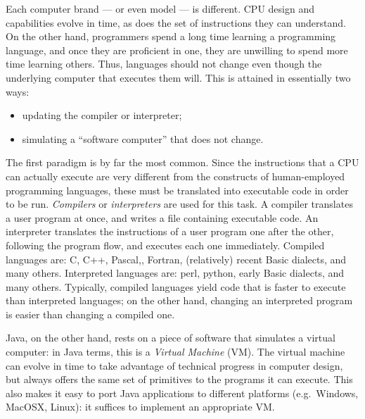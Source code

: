 \documentclass[a4paper]{book}
\theoremstyle{changebreak}                %
\begin{document}
Each computer brand --- or even model --- is different. CPU
design and capabilities evolve in time, as does the set of
instructions they can understand. On the other
hand, programmers spend a long time learning a programming
language, and once they are proficient in
one, they are unwilling to spend more time learning others. Thus,
languages should not change even though the underlying computer that
executes them will. This is attained in essentially two ways:
\begin{itemize}
\item updating the compiler or
  interpreter;
\item simulating a ``software computer'' that does not change.
\end{itemize}
The first paradigm is by far the most common. Since the instructions
that a CPU can actually execute are very different from the constructs
of human-employed programming languages, these must be translated into
executable code in order to be run. {\it Compilers} or
{\it interpreters} are used for this task. A
compiler translates a user program at once, and writes a file
containing executable code. An interpreter translates the instructions
of a user program one after the other, following the program flow, and
executes each one immediately. Compiled languages are: C,
C++, Pascal,, Fortran,
(relatively) recent Basic dialects, and many
others. Interpreted languages are: perl,
python, early Basic dialects, and many
others. Typically, compiled languages yield code that is faster to
execute than interpreted languages; on the other hand, changing an
interpreted program is easier than changing a compiled one.

Java, on the other hand, rests on a piece of software that
simulates a virtual computer: in Java terms, this is a {\it Virtual
  Machine} (VM). The virtual machine can evolve
in time to take advantage of technical progress in computer design,
but always offers the same set of primitives to the programs it can
execute. This also makes it easy to port Java applications to
different platforms (e.g.~Windows,
MacOSX, Linux): it suffices to implement an
appropriate VM.
\end{document}
